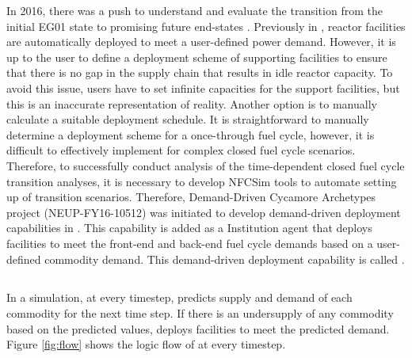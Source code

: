 In 2016, there was a push to understand and evaluate the 
transition from the initial EG01 state to promising future 
end-states \cite{feng_standardized_2016}.
Previously in \Cyclus, reactor facilities are automatically 
deployed to meet a user-defined power demand. 
However, it is up to the user to define a deployment scheme of 
supporting facilities to ensure that there is no gap in the supply 
chain that results in idle reactor capacity. 
To avoid this issue, users 
have to set infinite capacities for the support facilities, 
but this is an inaccurate representation of reality. 
Another option is to manually calculate a suitable deployment 
schedule. 
It is straightforward to manually determine a deployment scheme 
for a once-through fuel cycle, however, it is difficult to effectively 
implement for complex closed fuel cycle scenarios.  
Therefore, to successfully conduct analysis of the time-dependent 
closed fuel cycle transition
analyses, it is necessary to develop \gls{NFCSim} tools to  
automate setting up of transition scenarios. 
Therefore, Demand-Driven Cycamore Archetypes project
(NEUP-FY16-10512) was initiated to develop demand-driven deployment 
capabilities in \Cyclus.
This capability is added as a \Cyclus Institution
agent that deploys facilities to meet the front-end and back-end 
fuel cycle demands based on a user-defined commodity demand. 
This demand-driven deployment capability is called 
\deploy. 

\subsection{\deploy}
In a \Cyclus simulation, at every timestep, \deploy 
predicts supply and demand of each commodity for the next time 
step. 
If there is an undersupply of any commodity based 
on the predicted values, \deploy deploys facilities to meet 
the predicted demand.  
Figure \ref{fig:flow} shows the logic flow of \deploy 
at every timestep. 

